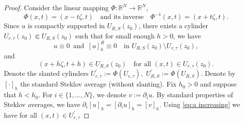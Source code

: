 \documentclass[notitlepage,11pt,reqno]{amsart}
\theoremstyle{definition}
\numberwithin{equation}{section}
\newcommand{\RR}{\mathds{R}}
\begin{document}
\begin{proof}
Consider the linear mapping $\Phi:\RR^{N}\rightarrow\RR^{N}$,
\[
\Phi(x,t)=(x-t\zeta,t)\quad\text{and its inverse}\quad\Phi^{-1}(x,t)=(x+t\zeta,t).
\]
Since $u$ is compactly supported in $U_{R, S}(z_0)$, there exists a cylinder
$U_{r, \tau}(z_0)\Subset U_{R, S}(z_0)$ such that for small enough $h>0$, we have
\begin{equation*}
u\equiv 0 \,\,\, \text{and}\,\,\,  [u]_{h}^{R}\equiv0\quad\text{in }U_{R, S}(z_0)\setminus U_{r, \tau}(z_0),
\end{equation*}
and 
\[
(x+h\zeta,t+h)\in U_{R, S}(z_0)\quad\text{for all }(x,t)\in U_{r, \tau}(z_0).
\]
Denote the slanted cylinders $U^{\prime}_{r, \tau}:=\Phi(U_{r, \tau}),$ $U_{R, S}^{\prime}:=\Phi(U_{R, S})$.
 Denote by $[\cdot]_{h}$ the standard Steklov average (without slanting). Fix $h_{0}>0$ and suppose that $h<h_{0}$. For $i \in \{1,\ldots,N\}$, we denote $v := \partial_i u$. By standard properties of Steklov averages, we have $\partial_i[u]_h = [\partial_i u]_h = [v]_h$.
Using \eqref{eq:a increasing} we have for all $(x,t)\in U^{\prime}_{r, \tau}$ 


\end{proof}
\end{document}
